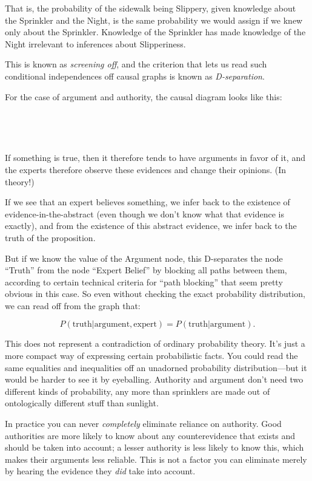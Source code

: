 {
 That is, the probability of the sidewalk being Slippery, given
knowledge about the Sprinkler and the Night, is the same probability we
would assign if we knew only about the Sprinkler. Knowledge of the
Sprinkler has made knowledge of the Night irrelevant to inferences
about Slipperiness.}

{
 This is known as \textit{screening off}, and the criterion that
lets us read such conditional independences off causal graphs is known
as \textit{D-separation}.}

{
 For the case of argument and authority, the causal diagram looks
like this:}

{
 ~}



{
 ~}

{
 If something is true, then it therefore tends to have arguments in
favor of it, and the experts therefore observe these evidences and
change their opinions. (In theory!)}

{
 If we see that an expert believes something, we infer back to the
existence of evidence-in-the-abstract (even though we
don't know what that evidence is exactly), and from the
existence of this abstract evidence, we infer back to the truth of the
proposition.}

{
 But if we know the value of the Argument node, this D-separates
the node ``Truth'' from the node
``Expert Belief'' by blocking all
paths between them, according to certain technical criteria for
``path blocking'' that seem pretty
obvious in this case. So even without checking the exact probability
distribution, we can read off from the graph that:}

\begin{equation*}
 P(\text{truth}|\text{argument}, \text{expert}) = P(\text{truth}|\text{argument}).
\end{equation*}

{
 This does not represent a contradiction of ordinary probability
theory. It's just a more compact way of expressing
certain probabilistic facts. You could read the same equalities and
inequalities off an unadorned probability distribution---but it would
be harder to see it by eyeballing. Authority and argument
don't need two different kinds of probability, any more
than sprinklers are made out of ontologically different stuff than
sunlight. }

{
 In practice you can never \textit{completely} eliminate reliance
on authority. Good authorities are more likely to know about any
counterevidence that exists and should be taken into account; a lesser
authority is less likely to know this, which makes their arguments less
reliable. This is not a factor you can eliminate merely by hearing the
evidence they \textit{did} take into account.}

